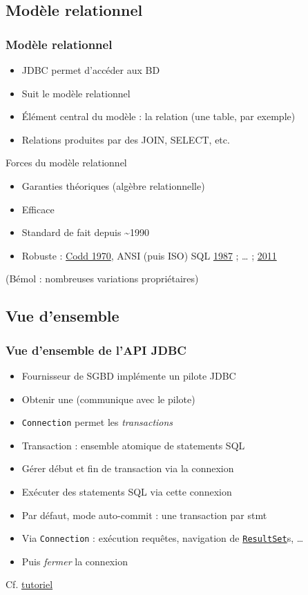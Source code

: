 \documentclass[english, french]{beamer}
\begin{document}
\subsection{Modèle relationnel}
\begin{frame}
	\frametitle{Modèle relationnel}
	\begin{itemize}
		\item JDBC permet d’accéder aux BD
		\item Suit le modèle relationnel
		\item Élément central du modèle : la relation (une table, par exemple)
		\item Relations produites par des JOIN, SELECT, etc.
	\end{itemize}
	\begin{block}{Forces du modèle relationnel}
		\pause
		\begin{itemize}
			\item Garanties théoriques (algèbre relationnelle)
			\item Efficace
			\item Standard de fait depuis \textasciitilde 1990
			\item Robuste : \href{http://dl.acm.org/citation.cfm?id=362685}{Codd 1970}, ANSI (puis ISO) SQL \href{http://www.iso.org/iso/home/store/catalogue_ics/catalogue_detail_ics.htm?csnumber=16661}{1987} ; … ; \href{http://www.iso.org/iso/home/store/catalogue_ics/catalogue_detail_ics.htm?csnumber=53681}{2011}
		\end{itemize}
	\end{block}
	(Bémol : nombreuses variations propriétaires)
\end{frame}

\subsection{Vue d’ensemble}
\begin{frame}
	\frametitle{Vue d’ensemble de l’API JDBC}
	\begin{itemize}
		\item Fournisseur de SGBD implémente un pilote JDBC
		\item Obtenir une  (communique avec le pilote)
		\item \texttt{Connection} permet les \emph{transactions}
		\item Transaction : ensemble atomique de \og{}statements\fg{} SQL
		\item Gérer début et fin de transaction via la connexion
		\item Exécuter des statements SQL via cette connexion
		\item Par défaut, mode auto-commit : une transaction par stmt
		\item Via \texttt{Connection} : exécution requêtes, navigation de \href{http://docs.oracle.com/javase/8/docs/api/java/sql/ResultSet.html}{\texttt{ResultSet}}s, …
		\item Puis \emph{fermer} la connexion
	\end{itemize}
	Cf. \href{https://docs.oracle.com/javase/tutorial/jdbc/}{tutoriel}
\end{frame}
\end{document}
